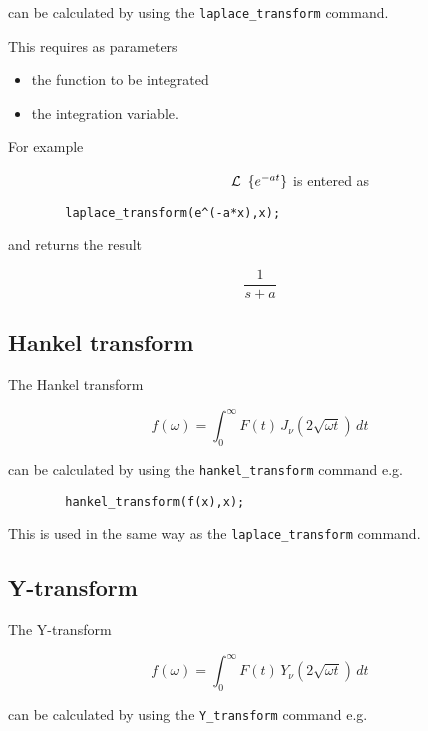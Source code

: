 can be calculated by using the \verb+laplace_transform+ command.

This requires as parameters

\begin{itemize}
\item the function to be integrated
\item the integration variable.
\end{itemize}

For example

$\hspace{56 mm} \cal L$ $\{e^{-at}\} \\$
is entered as

\begin{verbatim}
        laplace_transform(e^(-a*x),x);
\end{verbatim}

and returns the result

\begin{displaymath}
\frac{1}{s+a}
\end{displaymath}

\subsection{Hankel transform}

The Hankel transform

\begin{displaymath}
f(\omega) = \int_{0}^{\infty} F(t) \,J_{\nu}(2\sqrt{\omega t}) \,dt
\end{displaymath}

can be calculated by using the \verb+hankel_transform+ command e.g.

\begin{verbatim}
        hankel_transform(f(x),x);
\end{verbatim}

This is used in the same way as the \verb+laplace_transform+ command.

\subsection{Y-transform}

The Y-transform

\begin{displaymath}
f(\omega) = \int_{0}^{\infty} F(t) \,Y_{\nu}(2\sqrt{\omega t}) \,dt
\end{displaymath}

can be calculated by using the \verb+Y_transform+ command e.g.

